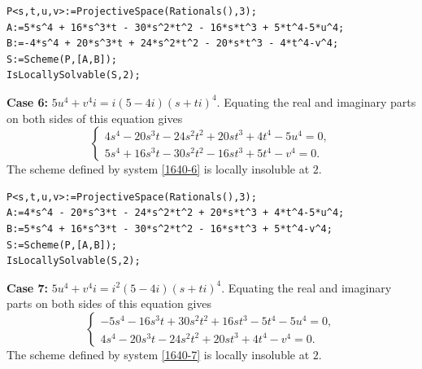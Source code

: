 \documentclass[a4paper,12pt,english,reqno]{amsart}
\begin{document}
\begin{lstlisting}
P<s,t,u,v>:=ProjectiveSpace(Rationals(),3);
A:=5*s^4 + 16*s^3*t - 30*s^2*t^2 - 16*s*t^3 + 5*t^4-5*u^4;
B:=-4*s^4 + 20*s^3*t + 24*s^2*t^2 - 20*s*t^3 - 4*t^4-v^4;
S:=Scheme(P,[A,B]);
IsLocallySolvable(S,2);
\end{lstlisting}

{\bf Case 6:} $5u^4+v^4i=i(5-4i)(s+ti)^4$. Equating the real and imaginary parts on both sides of this equation gives
\begin{equation}\label{1640-6}
\begin{cases}
4s^4 - 20s^3t - 24s^2t^2 + 20st^3 + 4t^4 - 5u^4=0,\\
5s^4 + 16s^3t - 30s^2t^2 - 16st^3 + 5t^4 - v^4=0.
\end{cases}
\end{equation}
The scheme defined by system \eqref{1640-6} is locally insoluble at $2$.


\begin{lstlisting}
P<s,t,u,v>:=ProjectiveSpace(Rationals(),3);
A:=4*s^4 - 20*s^3*t - 24*s^2*t^2 + 20*s*t^3 + 4*t^4-5*u^4;
B:=5*s^4 + 16*s^3*t - 30*s^2*t^2 - 16*s*t^3 + 5*t^4-v^4;
S:=Scheme(P,[A,B]);
IsLocallySolvable(S,2);
\end{lstlisting}

{\bf Case 7:} $5u^4+v^4i=i^2(5-4i)(s+ti)^4$. Equating the real and imaginary parts on both sides of this equation gives
\begin{equation}\label{1640-7}
\begin{cases}
-5s^4 - 16s^3t + 30s^2t^2 + 16st^3 - 5t^4 - 5u^4=0,\\
4s^4 - 20s^3t - 24s^2t^2 + 20st^3 + 4t^4 - v^4=0.
\end{cases}
\end{equation}
The scheme defined by system \eqref{1640-7} is locally insoluble at $2$.

\end{document}
